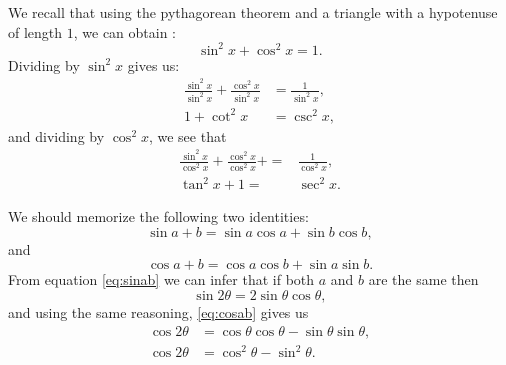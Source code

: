 We recall that using the pythagorean theorem and a triangle with a hypotenuse of length $1$, we can obtain :
\begin{equation*}
	\sin^2x+\cos^2x=1.
\end{equation*}
Dividing by $\sin^2x$ gives us:
\begin{align*}
    \frac{\sin^2x}{\sin^2x}+\frac{\cos^2x}{\sin^2x} &= \frac{1}{\sin^2x}, \\
    1+\cot^2x &= \csc^2x,
\end{align*}
and dividing by $\cos^2x$, we see that
\begin{align}
    \frac{\sin^2x}{\cos^2x}+\frac{\cos^2x}{\cos^2x}+=&\frac{1}{\cos^2x}, \nonumber \\
    \tan^2x+1=&\sec^2x.
\end{align}

We should memorize the following two identities:
\begin{equation}
  \sin{a+b}=\sin a \cos a + \sin b \cos b,
  \label{eq:sinab}
\end{equation}
and
\begin{equation}
  \cos{a+b}=\cos a \cos b + \sin a \sin b.
  \label{eq:cosab}
\end{equation}
From equation \eqref{eq:sinab} we can infer that if both $a$ and $b$ are the same then
\begin{equation}
  \sin{2\theta}=2 \sin \theta \cos \theta,
  \label{eq:sin2q}
\end{equation}
and using the same reasoning, \eqref{eq:cosab} gives us
\begin{align}
  \cos{2\theta}&=\cos \theta \cos \theta- \sin\theta \sin\theta, \nonumber\\
  \cos{2\theta}&=\cos^2 \theta - \sin^2\theta.
  \label{eq:cos2q}
\end{align}

